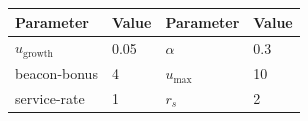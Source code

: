 \begin{table}
  \centering\footnotesize
  \setlength{\tabcolsep}{5pt}\renewcommand{\arraystretch}{1.05}
  
  
  \begin{tabular}{@{}ll ll@{}}
    \toprule
    \textbf{Parameter} & \textbf{Value} & \textbf{Parameter} & \textbf{Value} \\
    \midrule
    $u_{\mathrm{growth}}$ & 0.05 & $\alpha$   & 0.3 \\
    beacon-bonus          & 4    & $u_{\max}$ & 10  \\
    service-rate          & 1    & $r_s$      & 2   \\
    \bottomrule
  \end{tabular}
\end{table}
